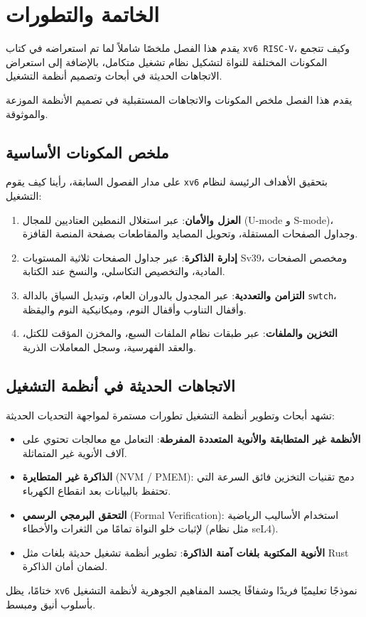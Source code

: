 \chapter{الخاتمة والتطورات}
\label{CH:SUM}

يقدم هذا الفصل ملخصًا شاملاً لما تم استعراضه في كتاب \texttt{xv6 RISC-V}، وكيف تتجمع المكونات المختلفة للنواة لتشكيل نظام تشغيل متكامل، بالإضافة إلى استعراض الاتجاهات الحديثة في أبحاث وتصميم أنظمة التشغيل.

يقدم هذا الفصل ملخص المكونات والاتجاهات المستقبلية في تصميم الأنظمة الموزعة والموثوقة.

\section{ملخص المكونات الأساسية}
\label{sec:summary_components}

على مدار الفصول السابقة، رأينا كيف يقوم \texttt{xv6} بتحقيق الأهداف الرئيسة لنظام التشغيل:
\begin{enumerate}
  \item \textbf{العزل والأمان}: عبر استغلال النمطين العتاديين للمجال (U-mode و S-mode)، وجداول الصفحات المستقلة، وتحويل المصايد والمقاطعات بصفحة المنصة القافزة.
  \item \textbf{إدارة الذاكرة}: عبر جداول الصفحات ثلاثية المستويات Sv39، ومخصص الصفحات المادية، والتخصيص التكاسلي، والنسخ عند الكتابة.
  \item \textbf{التزامن والتعددية}: عبر المجدول بالدوران العام، وتبديل السياق بالدالة \texttt{swtch}، وأقفال التناوب وأقفال النوم، وميكانيكية النوم واليقظة.
  \item \textbf{التخزين والملفات}: عبر طبقات نظام الملفات السبع، والمخزن المؤقت للكتل، والعقد الفهرسية، وسجل المعاملات الذرية.
\end{enumerate}

\section{الاتجاهات الحديثة في أنظمة التشغيل}
\label{sec:future_trends}

تشهد أبحاث وتطوير أنظمة التشغيل تطورات مستمرة لمواجهة التحديات الحديثة:
\begin{itemize}
  \item \textbf{الأنظمة غير المتطابقة والأنوية المتعددة المفرطة}: التعامل مع معالجات تحتوي على آلاف الأنوية غير المتماثلة.
  \item \textbf{الذاكرة غير المتطايرة} (NVM / PMEM): دمج تقنيات التخزين فائق السرعة التي تحتفظ بالبيانات بعد انقطاع الكهرباء.
  \item \textbf{التحقق البرمجي الرسمي} (Formal Verification): استخدام الأساليب الرياضية لإثبات خلو النواة تمامًا من الثغرات والأخطاء (مثل نظام seL4).
  \item \textbf{الأنوية المكتوبة بلغات آمنة الذاكرة}: تطوير أنظمة تشغيل حديثة بلغات مثل Rust لضمان أمان الذاكرة.
\end{itemize}

ختامًا، يظل \texttt{xv6} نموذجًا تعليميًا فريدًا وشفافًا يجسد المفاهيم الجوهرية لأنظمة التشغيل بأسلوب أنيق ومبسط.
